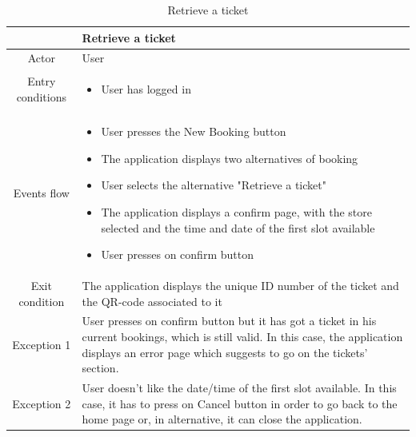 \documentclass[table, 12pt]{article}
\begin{document}
\begin{longtable}{|c| p{10cm}|}
    \caption{Retrieve a ticket}                                                                                                                                                                                                 \\
    \hline
                     & Retrieve a ticket                                                                                                                                                                                        \\
    \hline
    Actor            & User                                                                                                                                                                                                     \\
    \hline
    Entry conditions & \begin{itemize}
        \item User has logged in
    \end{itemize}                                                                                                                                                                               \\
    \hline
    Events flow      & \begin{itemize}[nosep,after=\strut]
        \item User presses the New Booking button
        \item The application displays two alternatives of booking
        \item User selects the alternative "Retrieve a ticket"
        \item The application displays a confirm page, with the store selected and the time and date of the first slot available
        \item User presses on confirm button
    \end{itemize}                                                                                                                                                                               \\
    \hline
    Exit condition   &
    The application displays the unique ID number of the ticket and the QR-code associated to it                                                                                                                                \\
    \hline
    \hline
    Exception 1      & User presses on confirm button but it has got a ticket in his current bookings, which is still valid. In this case, the application displays an error page which suggests to go on the tickets' section. \\
    \hline
    Exception 2      & User doesn't like the date/time of the first slot available. In this case, it has to press on Cancel button in order to go back to the home page or, in alternative, it can close the application.       \\
    \hline
\end{longtable}
\end{document}
